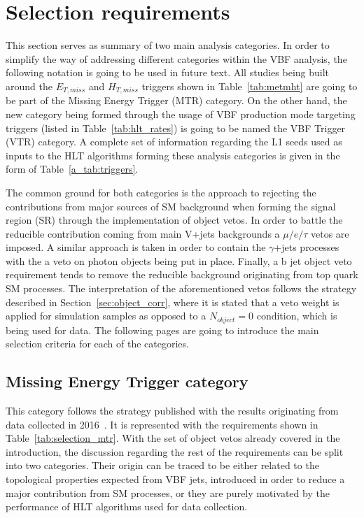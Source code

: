 \section{Selection requirements}
\hspace{10pt} This section serves as summary of two main analysis categories. In order to simplify the way of addressing different categories within the VBF analysis, the following notation is going to be used in future text. All studies being built around the $E_{T,miss}$ and $H_{T,miss}$ triggers shown in Table~\ref{tab:metmht} are going to be part of the Missing Energy Trigger (MTR) category. On the other hand, the new category being formed through the usage of VBF production mode targeting triggers (listed in Table~\ref{tab:hlt_rates}) is going to be named the VBF Trigger (VTR) category. A complete set of information regarding the L1 seeds used as inputs to the HLT algorithms forming these analysis categories is given in the form of Table~\ref{a_tab:triggers}.

\hspace{10pt} The common ground for both categories is the approach to rejecting the contributions from major sources of SM background when forming the signal region (SR) through the implementation of object vetos. In order to battle the reducible contribution coming from main V+jets backgrounds a $\mu/e/\tau$ vetos are imposed. A similar approach is taken in order to contain the $\gamma$+jets processes with the a veto on photon objects being put in place. Finally, a b jet object veto requirement tends to remove the reducible background originating from top quark SM processes. The interpretation of the aforementioned vetos follows the strategy described in Section~\ref{sec:object_corr}, where it is stated that a veto weight is applied for simulation samples as opposed to a $N_{object}=0$ condition, which is being used for data. The following pages are going to introduce the main selection criteria for each of the categories.
\subsection{Missing Energy Trigger category}
\label{subsec:vbfselection}

\hspace{10pt} This category follows the strategy published with the results originating from data collected in 2016~\cite{paper:HIG_17_023}. It is represented with the requirements shown in Table~\ref{tab:selection_mtr}. With the set of object vetos already covered in the introduction, the discussion regarding the rest of the requirements can be split into two categories. Their origin can be traced to be either related to the topological properties expected from VBF jets, introduced in order to reduce a major contribution from SM processes, or they are purely motivated by the performance of HLT algorithms used for data collection.

